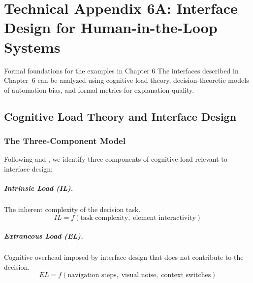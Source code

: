 
\chapter*{Technical Appendix 6A: Interface Design for Human-in-the-Loop Systems}

\begin{chapterquote}{Formal foundations for the examples in Chapter 6}
The interfaces described in Chapter~6 can be analyzed using cognitive load theory, decision-theoretic models of automation bias, and formal metrics for explanation quality.
\end{chapterquote}

\apxnumon
\section{Cognitive Load Theory and Interface Design}

\subsection{The Three-Component Model}

Following \textcite{sweller1988cognitive} and \textcite{paas1994variability}, we identify three components of cognitive load relevant to \hitl interface design:

\paragraph{Intrinsic Load (IL).} The inherent complexity of the decision task.
\[
IL = f(\text{task complexity},\; \text{element interactivity})
\]

\paragraph{Extraneous Load (EL).} Cognitive overhead imposed by interface design that does not contribute to the decision.
\[
EL = f(\text{navigation steps},\; \text{visual noise},\; \text{context switches})
\]

